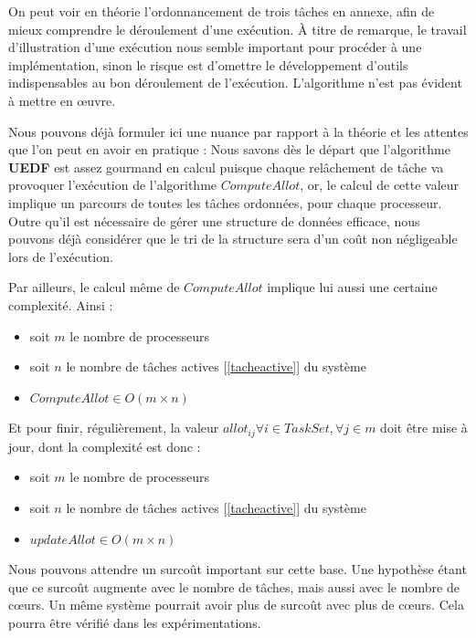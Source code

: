 	On peut voir en théorie l'ordonnancement de trois tâches en annexe, afin de mieux comprendre le déroulement d'une exécution.
	À titre de remarque, le travail d'illustration d'une exécution nous semble 
	important pour procéder à une implémentation, sinon le risque est d'omettre le développement 
	d'outils indispensables au bon déroulement de l'exécution. L'algorithme n'est pas évident à mettre en œuvre.
	\newline
	
	Nous pouvons déjà formuler ici une nuance par rapport à la théorie et les attentes que l'on peut en avoir 
	en pratique : 
	Nous savons dès le départ que l'algorithme \textbf{UEDF} est assez gourmand en calcul puisque chaque relâchement de 
	tâche va provoquer l'exécution de l'algorithme $Compute Allot$, or, le calcul de cette valeur 
	implique un parcours de toutes les tâches ordonnées, pour chaque processeur. 
	Outre qu'il est nécessaire de gérer une structure de données efficace, nous pouvons 
	déjà considérer que le tri de la structure sera d'un coût non négligeable lors de l'exécution. \newline
	
	Par ailleurs, le calcul même de $Compute Allot$ implique lui aussi une certaine complexité.
	Ainsi :
	\begin{itemize}
		\setlength\itemsep{0.1em}
		\item soit $m$ le nombre de processeurs
		\item soit $n$ le nombre de tâches actives [\ref*{tacheactive}] du système
		\item $Compute Allot \in O(m\times n)$
	\end{itemize}

	Et pour finir, régulièrement, la valeur $allot_{ij} \forall i \in TaskSet, \forall j \in m$ doit être mise 
	à jour, dont la complexité est donc :
	\begin{itemize}
		\setlength\itemsep{0.1em}
			\item soit $m$ le nombre de processeurs
			\item soit $n$ le nombre de tâches actives [\ref*{tacheactive}] du système
			\item $update Allot \in O(m\times n)$
	\end{itemize}

	Nous pouvons attendre un surcoût important sur cette base. Une hypothèse étant que ce surcoût 
	augmente avec le nombre de tâches, mais aussi avec le nombre de cœurs. Un même système pourrait avoir plus 
	de surcoût avec plus de cœurs. Cela pourra être vérifié dans les expérimentations.


